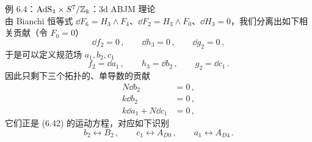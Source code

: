 \begin{examplebox}{例 6.4：$\mathrm{AdS}_4 \times S^7/\mathbb{Z}_k$：3d ABJM 理论}
\begin{equation}
\end{equation}
由 Bianchi 恒等式 $\dd F_6 = H_3 \wedge F_4$、$\dd F_2 = H_3 \wedge F_0$、$\dd H_3 = 0$，我们分离出如下相关贡献（令 $F_0 = 0$）
\begin{equation}
  \dd f_2 = 0\,,\qquad \dd h_3 = 0\,,\qquad \dd g_2 = 0\,, \tag{6.51}
\end{equation}
于是可以定义规范场 $a_1,b_2,c_1$
\begin{equation}
  f_2 = \dd a_1\,,\qquad h_3 = \dd b_2\,,\qquad g_2 = \dd c_1\,. \tag{6.52}
\end{equation}
因此只剩下三个拓扑的、单导数的贡献
\begin{equation}
\begin{aligned}
N \dd b_2 &= 0\,,\\
k \dd b_2 &= 0\,,\\
k \dd a_1 + N \dd c_1 &= 0\,,
\end{aligned}\tag{6.53}
\end{equation}
它们正是 (6.42) 的运动方程，对应如下识别
\begin{equation}
  b_2 \leftrightarrow B_2\,,\qquad c_1 \leftrightarrow A_{D0}\,,\qquad a_1 \leftrightarrow A_{D4}\,. \tag{6.54}
\end{equation}
\end{examplebox}


